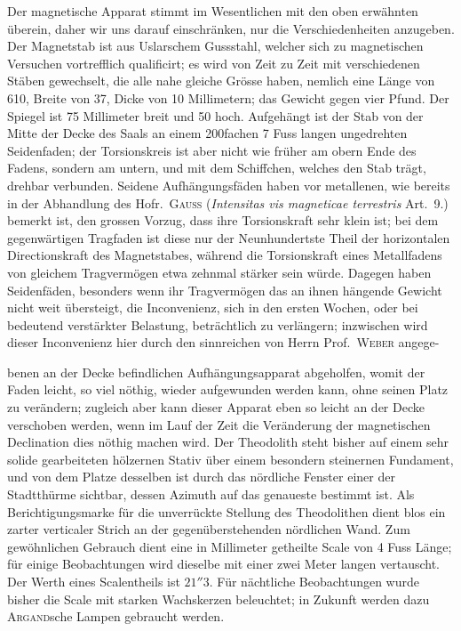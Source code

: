 Der magnetische Apparat stimmt im Wesentlichen mit den oben erwähnten überein, daher wir uns darauf einschränken, nur die Verschiedenheiten anzugeben. Der Magnetstab ist aus Uslarschem Gussstahl, welcher sich zu magnetischen Versuchen vortrefflich qualificirt; es wird von Zeit zu Zeit mit verschiedenen Stäben gewechselt, die alle nahe gleiche Grösse haben, nemlich eine Länge von 610, Breite von 37, Dicke von 10 Millimetern; das Gewicht gegen vier Pfund. Der Spiegel ist 75 Millimeter breit und 50 hoch. Aufgehängt ist der Stab von der Mitte der Decke des Saals an einem 200fachen 7 Fuss langen ungedrehten Seidenfaden; der Torsionskreis ist aber nicht wie früher am obern Ende des Fadens, sondern am untern, und mit dem Schiffchen, welches den Stab trägt, drehbar verbunden. Seidene Aufhängungsfäden haben vor metallenen, wie bereits in der Abhandlung des Hofr.\ \textsc{Gauss} (\textit{Intensitas vis magneticae terrestris} Art.\ 9.) bemerkt ist, den grossen Vorzug, dass ihre Torsionskraft sehr klein ist; bei dem gegenwärtigen Tragfaden ist diese nur der Neunhundertste Theil der horizontalen Directionskraft des Magnetstabes, während die Torsionskraft eines Metallfadens von gleichem Tragvermögen etwa zehnmal stärker sein würde. Dagegen haben Seidenfäden, besonders wenn ihr Tragvermögen das an ihnen hängende Gewicht nicht weit übersteigt, die Inconvenienz, sich in den ersten Wochen, oder bei bedeutend verstärkter Belastung, beträchtlich zu verlängern; inzwischen wird dieser Inconvenienz hier durch den sinnreichen von Herrn Prof.\ \textsc{Weber} angege-
\par\clearpage
{}
\noindent benen an der Decke befindlichen Aufhängungsapparat abgeholfen, womit der Faden leicht, so viel nöthig, wieder aufgewunden werden kann, ohne seinen Platz zu verändern; zugleich aber kann dieser Apparat eben so leicht an der Decke verschoben werden, wenn im Lauf der Zeit die Veränderung der magnetischen Declination dies nöthig machen wird. Der Theodolith steht bisher auf einem sehr solide gearbeiteten hölzernen Stativ über einem besondern steinernen Fundament, und von dem Platze desselben ist durch das nördliche Fenster einer der Stadtthürme sichtbar, dessen Azimuth auf das genaueste bestimmt ist. Als Berichtigungsmarke für die unverrückte Stellung des Theodolithen dient blos ein zarter verticaler Strich an der gegenüberstehenden nördlichen Wand. Zum gewöhnlichen Gebrauch dient eine in Millimeter getheilte Scale von 4 Fuss Länge; für einige Beobachtungen wird dieselbe mit einer zwei Meter langen vertauscht. Der Werth eines Scalentheils ist $21''3$. Für nächtliche Beobachtungen wurde bisher die Scale mit starken Wachskerzen beleuchtet; in Zukunft werden dazu \textsc{Argand}sche Lampen gebraucht werden.

